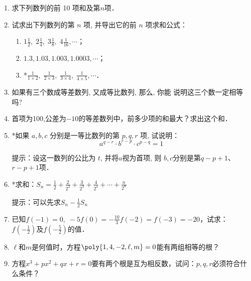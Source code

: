 \begin{enumerate}
    \item 求下列数列的前 10 项和及第$n$项．
\begin{enumerate}
\end{enumerate}

\item 试求出下列数列的第 $n$ 项, 并导出它的前 $n$ 项求和公式：
\begin{enumerate}
    \item $1 \frac{1}{2},\; 2 \frac{1}{4}, \;3 \frac{1}{8} ,\; 4 \frac{1}{16}, \cdots$；
    \item $ 1.3,1.03,1.003,1.0003, \cdots$；
    \item *$\frac{1}{1 \times 2},\; \frac{1}{2 \times 3},\; \frac{1}{3 \times 4},\; \frac{1}{4 \times 5},\cdots$．
\end{enumerate}

\item 如果有三个数成等差数列, 又成等比数列, 那么, 你能
    说明这三个数一定相等吗?
    \item 首项为100,公差为$-10$的等差数列中，前多少项的和最大？求出这个和．
\item  *如果 $a, b, c$ 分别是一等比数列的第 $p, q, r$ 项, 试说明：
    $$a^{q-r} \cdot b^{r-p} \cdot c^{p-q}=1$$
    
    提示：设这一数列的公比为 $t$, 并将$a$视为首项, 则 $b, c$分别是第$q-p+1$、$r-p+1$项．

\item *求和：$S_n=\frac{1}{2}+\frac{2}{2^2}+\frac{3}{2^3}+\frac{4}{2^4}+\cdots+\frac{n}{2^n}$

提示：可以先求$S_n-\frac{1}{2}S_n$


\item 已知$f(-1)=0,\; -5f(0)=-\frac{10}{3}f(-2)=f(-3)=-20$，试求：$f\left(-\frac{1}{2}\right)$及$f\left(-\frac{5}{2}\right)$的值．

\item $\ell$和$m$是何值时，方程$\poly{1,4,-2,\ell ,m}=0$能有两组相等的根？
\item 方程$x^3+px^2+qx+r=0$要有两个根是互为相反数，试问：$p,q,r$必须符合什么条件？


\end{enumerate}

